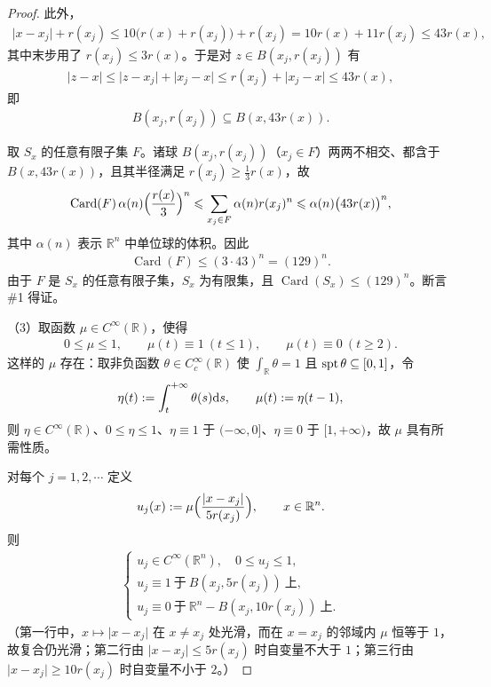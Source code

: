 \documentclass[../../main.tex]{subfiles}%
\begin{document}
\begin{proof}
此外，
\begin{align*}
\lvert x-x_j\rvert+r(x_j)\leqslant10\bigl(r(x)+r(x_j)\bigr)+r(x_j)=10r(x)+11r(x_j)\leqslant43r(x),
\end{align*}
其中末步用了 $r(x_j)\leqslant3r(x)$。于是对 $z\in B(x_j,r(x_j))$ 有
\begin{align*}
\lvert z-x\rvert\leqslant\lvert z-x_j\rvert+\lvert x_j-x\rvert\leqslant r(x_j)+\lvert x_j-x\rvert\leqslant43r(x),
\end{align*}
即
\begin{align*}
B(x_j,r(x_j))\subseteq B(x,43r(x)).
\end{align*}

取 $S_x$ 的任意有限子集 $F$。诸球 $B(x_j,r(x_j))$（$x_j\in F$）两两不相交、都含于 $B(x,43r(x))$，且其半径满足 $r(x_j)\geqslant\frac{1}{3}r(x)$，故
\begin{align*}
\operatorname{Card}(F)\,\alpha(n)\Bigl(\frac{r(x)}{3}\Bigr)^n\leqslant\sum_{x_j\in F}\alpha(n)r(x_j)^n\leqslant\alpha(n)\bigl(43r(x)\bigr)^n,
\end{align*}
其中 $\alpha(n)$ 表示 $\mathbb{R}^n$ 中单位球的体积。因此
\begin{align*}
\operatorname{Card}(F)\leqslant(3\cdot43)^n=(129)^n.
\end{align*}
由于 $F$ 是 $S_x$ 的任意有限子集，$S_x$ 为有限集，且 $\operatorname{Card}(S_x)\leqslant(129)^n$。断言 \#1 得证。

（3）取函数 $\mu\in C^{\infty}(\mathbb{R})$，使得
\begin{align*}
0\leqslant\mu\leqslant1,\qquad \mu(t)\equiv1\ (t\leqslant1),\qquad \mu(t)\equiv0\ (t\geqslant2).
\end{align*}
这样的 $\mu$ 存在：取非负函数 $\theta\in C_c^{\infty}(\mathbb{R})$ 使 $\int_{\mathbb{R}}\theta=1$ 且 $\operatorname{spt}\theta\subseteq[0,1]$，令
\begin{align*}
\eta(t):=\int_t^{+\infty}\theta(s)\mathrm{d} s,\qquad \mu(t):=\eta(t-1),
\end{align*}
则 $\eta\in C^{\infty}(\mathbb{R})$、$0\leqslant\eta\leqslant1$、$\eta\equiv1$ 于 $(-\infty,0]$、$\eta\equiv0$ 于 $[1,+\infty)$，故 $\mu$ 具有所需性质。

对每个 $j=1,2,\cdots$ 定义
\begin{align*}
u_j(x):=\mu\Bigl(\frac{\lvert x-x_j\rvert}{5r(x_j)}\Bigr),\qquad x\in\mathbb{R}^n.
\end{align*}
则
\begin{align*}
\begin{cases}
u_j\in C^{\infty}(\mathbb{R}^n),\quad 0\leqslant u_j\leqslant1,\\
u_j\equiv1\ \text{于}\ B(x_j,5r(x_j))\ \text{上},\\
u_j\equiv0\ \text{于}\ \mathbb{R}^n-B(x_j,10r(x_j))\ \text{上}.
\end{cases}
\end{align*}
（第一行中，$x\mapsto\lvert x-x_j\rvert$ 在 $x\neq x_j$ 处光滑，而在 $x=x_j$ 的邻域内 $\mu$ 恒等于 $1$，故复合仍光滑；第二行由 $\lvert x-x_j\rvert\leqslant5r(x_j)$ 时自变量不大于 $1$；第三行由 $\lvert x-x_j\rvert\geqslant10r(x_j)$ 时自变量不小于 $2$。）


\end{proof}
\end{document}
